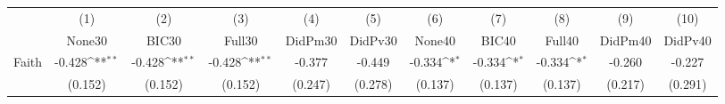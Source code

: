{
\def\sym#1{\ifmmode^{#1}\else\(^{#1}\)\fi}
\begin{tabular}{l*{10}{c}}
\toprule
            &\multicolumn{1}{c}{(1)}&\multicolumn{1}{c}{(2)}&\multicolumn{1}{c}{(3)}&\multicolumn{1}{c}{(4)}&\multicolumn{1}{c}{(5)}&\multicolumn{1}{c}{(6)}&\multicolumn{1}{c}{(7)}&\multicolumn{1}{c}{(8)}&\multicolumn{1}{c}{(9)}&\multicolumn{1}{c}{(10)}\\
            &\multicolumn{1}{c}{None30}&\multicolumn{1}{c}{BIC30}&\multicolumn{1}{c}{Full30}&\multicolumn{1}{c}{DidPm30}&\multicolumn{1}{c}{DidPv30}&\multicolumn{1}{c}{None40}&\multicolumn{1}{c}{BIC40}&\multicolumn{1}{c}{Full40}&\multicolumn{1}{c}{DidPm40}&\multicolumn{1}{c}{DidPv40}\\
\midrule
Faith       &      -0.428\sym{**} &      -0.428\sym{**} &      -0.428\sym{**} &      -0.377         &      -0.449         &      -0.334\sym{*}  &      -0.334\sym{*}  &      -0.334\sym{*}  &      -0.260         &      -0.227         \\
            &     (0.152)         &     (0.152)         &     (0.152)         &     (0.247)         &     (0.278)         &     (0.137)         &     (0.137)         &     (0.137)         &     (0.217)         &     (0.291)         \\
\bottomrule
\end{tabular}
}
